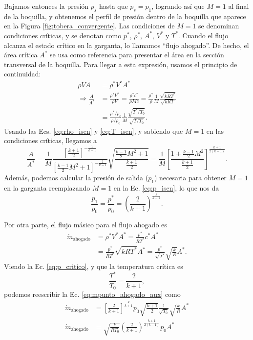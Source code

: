 Bajamos entonces la presión $p_s$ hasta que $p_s=p_1$, logrando así que $M=1$ al final de la boquilla, y obtenemos el perfil de presión dentro de la boquilla que aparece en la Figura \ref{fig:tobera_convergente}.
Las condiciones de $M=1$ se denominan condiciones críticas, y se denotan como $p^*$, $\rho^*$, $A^*$, $V^*$ y $T^*$.
Cuando el flujo alcanza el estado crítico en la garganta, lo llamamos ``flujo ahogado''.
De hecho, el área crítica $A^*$ se usa como referencia para presentar el área en la sección transversal de la boquilla.
Para llegar a esta expresión, usamos el principio de continuidad:
%
\begin{align}
\rho VA &= \rho^* V^* A^*\nonumber\\
\Rightarrow \frac{A}{A^*} &= \frac{\rho^* V^*}{\rho V} = \frac{\rho^* c^*}{\rho Mc} = \frac{\rho^*}{\rho} \frac{1}{M}\frac{\sqrt{kRT^*}}{\sqrt{kRT}}\nonumber\\
&=\frac{\rho^*/\rho_0}{\rho/\rho_0} \frac{1}{M}\frac{\sqrt{T^*/T_0}}{\sqrt{T/T_0}}.
\end{align}
%
Usando las Ecs. \eqref{eq:rho_isen} y \eqref{eq:T_isen}, y sabiendo que $M=1$ en las condiciones críticas, llegamos a
%
\begin{equation}
\frac{A}{A^*} = \frac{1}{M} \frac{\left[\frac{k+1}{2}\right]^{-\frac{1}{k-1}}}{\left[\frac{k-1}{2}M^2+1\right]^{-\frac{1}{k-1}}} \sqrt{\frac{\frac{k-1}{2}M^2+1}{\frac{k+1}{2}}} = \frac{1}{M} \left[\frac{1+\frac{k-1}{2}M^2}{\frac{k+1}{2}}\right]^{\frac{k+1}{2(k-1)}}.
\end{equation}
%
Además, podemos calcular la presión de salida ($p_1$) necesaria para obtener $M=1$ en la garganta reemplazando $M=1$ en la Ec. \eqref{eq:p_isen}, lo que nos da
%
\begin{equation}\label{eq:p_critico}
\frac{p_1}{p_0} = \frac{p^*}{p_0} = \left(\frac{2}{k+1}\right)^{\frac{k}{k-1}}.
\end{equation}

Por otra parte, el flujo másico para el flujo ahogado es
%
\begin{align}\label{eq:mpunto_ahogado_aux}
\dot{m}_\text{ahogado} &= \rho^* V^*A^* = \frac{p^*}{RT^*}c^*A^*\nonumber\\
&= \frac{p^*}{RT^*}\sqrt{kRT^*}A^* = \frac{p^*}{\sqrt{T^*}}\sqrt{\frac{k}{R}}A^*.
\end{align}
%
Viendo la Ec. \eqref{eq:p_critico}, y que la temperatura crítica es
%
\begin{equation}
\frac{T^*}{T_0} = \frac{2}{k+1},
\end{equation}
%
podemos reescribir la Ec. \eqref{eq:mpunto_ahogado_aux} como
%
\begin{align}\label{eq:mpunto_ahogado}
\dot{m}_\text{ahogado} &= \left[\frac{2}{k+1}\right]^{\frac{k}{k+1}}p_0\sqrt{\frac{k+1}{2}}\frac{1}{\sqrt{T_0}}\sqrt{\frac{k}{R}}A^*\nonumber\\
\dot{m}_\text{ahogado} &= \sqrt{\frac{k}{RT_0}}\left(\frac{2}{k+1}\right)^{\frac{k+1}{2(k-1)}}p_0A^*
\end{align}


